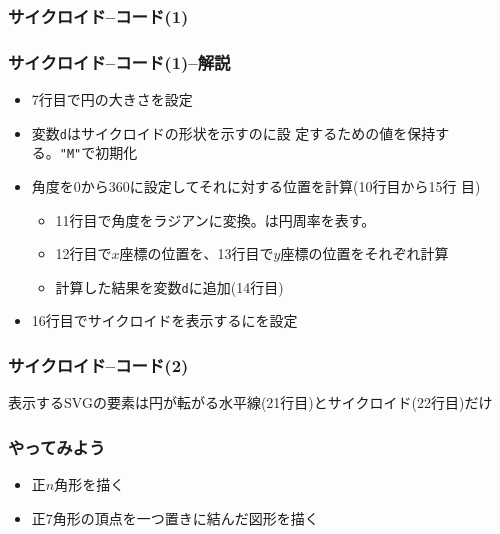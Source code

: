 \begin{frame}[containsverbatim]
 \frametitle{サイクロイド--コード(1)}
\end{frame}
\begin{frame}[containsverbatim]
 \frametitle{サイクロイド--コード(1)--解説}
\begin{itemize}
 \item 7行目で円の大きさを設定
 \item 変数\texttt{d}はサイクロイドの形状を示すのに設
       定するための値を保持する。\texttt{"M"}で初期化
 \item 角度を$0$から$360$に設定してそれに対する位置を計算(10行目から15行
       目)
   \begin{itemize}
    \item 11行目で角度をラジアンに変換。は円周率を表す。
    \item 12行目で$x$座標の位置を、13行目で$y$座標の位置をそれぞれ計算
    \item 計算した結果を変数\texttt{d}に追加(14行目)
   \end{itemize}
 \item 16行目でサイクロイドを表示するにを設定
\end{itemize}
\end{frame}
\begin{frame}[containsverbatim]
 \frametitle{サイクロイド--コード(2)}
 表示するSVGの要素は円が転がる水平線(21行目)とサイクロイド(22行目)だけ
\end{frame}
\begin{frame}[containsverbatim]
 \frametitle{やってみよう}
\begin{itemize}
 \item 正$n$角形を描く
 \item 正$7$角形の頂点を一つ置きに結んだ図形を描く
\end{itemize}
\end{frame}


